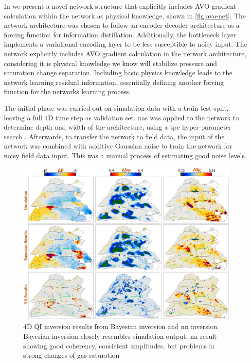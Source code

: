 In \citet{dramsch2019including} we present a novel network structure that explicitly includes AVO gradient calculation within the network as physical knowledge, shown in \cref{fig:avo-net}. The network architecture was chosen to follow an encoder-decoder architecture as a forcing function for information distillation. Additionally, the bottleneck layer implements a variational encoding layer to be less susceptible to noisy input. The network explicitly includes AVO gradient calculation in the network architecture, considering it is physical knowledge we know will stabilize pressure and saturation change separation. Including basic physics knowledge leads to the network learning residual information, essentially defining another forcing function for the networks learning process.

The initial phase was carried out on simulation data with a train test split, leaving a full 4D time step as validation set. \acl{nas} was applied to the network to determine depth and width of the architecture, using a \ac{tpe} hyper-parameter search \citep{bergstra2015hyperopt}. Afterwards, to transfer the network to field data, the input of the network was combined with additive Gaussian noise \citep{bishop1995training} to train the network for noisy field data input. This was a manual process of estimating good noise levels.

\begin{figure}
    \centering
    \includegraphics[width=\textwidth]{figures/NN_results.PNG}
    \caption{4D QI inversion results from Bayesian inversion and \acl{nn} inversion. Bayesian inversion closely resembles simulation output. \ac{nn} result showing good coherency, consistent amplitudes, but problems in strong changes of gas saturation \citep[from][]{dramsch2019deep}}
    \label{fig:avo-net-results}
\end{figure}

